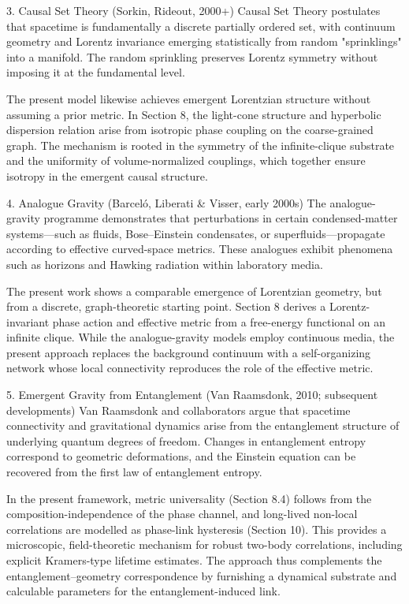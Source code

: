 \documentclass[11pt]{article}
\begin{document}
3. Causal Set Theory (Sorkin, Rideout, 2000+)
\quad Causal Set Theory postulates that spacetime is fundamentally a discrete partially ordered set, with continuum geometry and Lorentz invariance emerging statistically from random "sprinklings" into a manifold. The random sprinkling preserves Lorentz symmetry without imposing it at the fundamental level.

The present model likewise achieves emergent Lorentzian structure without assuming a prior metric. In Section 8, the light-cone structure and hyperbolic dispersion relation arise from isotropic phase coupling on the coarse-grained graph. The mechanism is rooted in the symmetry of the infinite-clique substrate and the uniformity of volume-normalized couplings, which together ensure isotropy in the emergent causal structure.

4. Analogue Gravity (Barcel\'o, Liberati \& Visser, early 2000s)
\quad The analogue-gravity programme demonstrates that perturbations in certain condensed-matter systems—such as fluids, Bose–Einstein condensates, or superfluids—propagate according to effective curved-space metrics. These analogues exhibit phenomena such as horizons and Hawking radiation within laboratory media.

The present work shows a comparable emergence of Lorentzian geometry, but from a discrete, graph-theoretic starting point. Section 8 derives a Lorentz-invariant phase action and effective metric from a free-energy functional on an infinite clique. While the analogue-gravity models employ continuous media, the present approach replaces the background continuum with a self-organizing network whose local connectivity reproduces the role of the effective metric.

5. Emergent Gravity from Entanglement (Van Raamsdonk, 2010; subsequent developments)
\quad Van Raamsdonk and collaborators argue that spacetime connectivity and gravitational dynamics arise from the entanglement structure of underlying quantum degrees of freedom. Changes in entanglement entropy correspond to geometric deformations, and the Einstein equation can be recovered from the first law of entanglement entropy.

In the present framework, metric universality (Section 8.4) follows from the composition-independence of the phase channel, and long-lived non-local correlations are modelled as phase-link hysteresis (Section 10). This provides a microscopic, field-theoretic mechanism for robust two-body correlations, including explicit Kramers-type lifetime estimates. The approach thus complements the entanglement–geometry correspondence by furnishing a dynamical substrate and calculable parameters for the entanglement-induced link.
\end{document}
